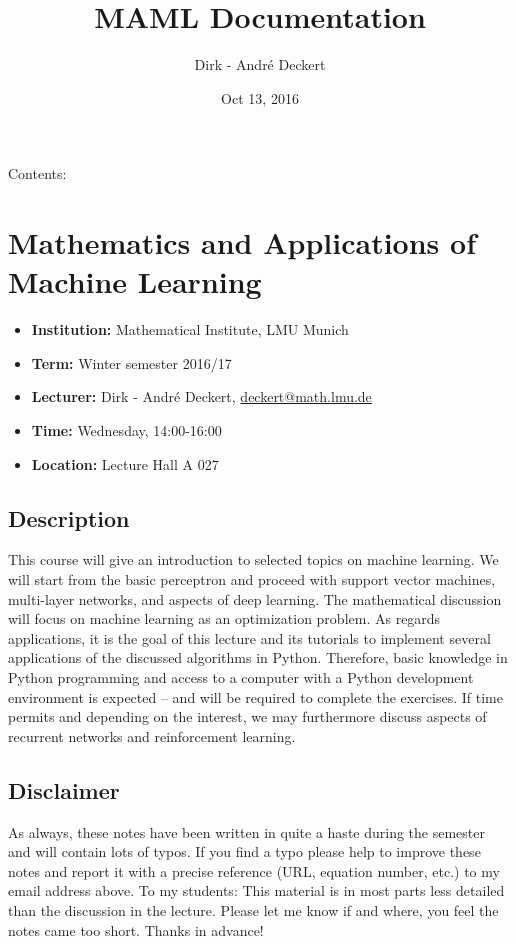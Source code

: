 \documentclass[letterpaper,10pt,english]{sphinxmanual}
\title{MAML Documentation}
\date{Oct 13, 2016}
\author{Dirk - André Deckert}
\begin{document}
\maketitle
\tableofcontents
{}\label{index::doc}


Contents:


\chapter{Mathematics and Applications of Machine Learning}
\label{readme:mathematics-and-applications-of-machine-learning}\label{readme::doc}\begin{itemize}
\item {} 
\textbf{Institution:} Mathematical Institute, LMU Munich

\item {} 
\textbf{Term:} Winter semester 2016/17

\item {} 
\textbf{Lecturer:} Dirk - André Deckert, \href{mailto:deckert@math.lmu.de}{deckert@math.lmu.de}

\item {} 
\textbf{Time:} Wednesday, 14:00-16:00

\item {} 
\textbf{Location:} Lecture Hall A 027

\end{itemize}


\section{Description}
\label{readme:description}
This course will give an introduction to selected topics on machine learning.
We will start from the basic perceptron and proceed with support vector
machines, multi-layer networks, and aspects of deep learning. The mathematical
discussion will focus on machine learning as an optimization problem. As
regards applications, it is the goal of this lecture and its tutorials to
implement several applications of the discussed algorithms in Python.
Therefore, basic knowledge in Python programming and access to a computer with
a Python development environment is expected -- and will be required to
complete the exercises. If time permits and depending on the interest, we may
furthermore discuss aspects of recurrent networks and reinforcement learning.


\section{Disclaimer}
\label{readme:disclaimer}
As always, these notes have been written in quite a haste during the semester
and will contain lots of typos. If you find a typo please help to improve these
notes and report it with a precise reference (URL, equation number, etc.) to my
email address above. To my students: This material is in most parts less
detailed than the discussion in the lecture. Please let me know if and where,
you feel the notes came too short. Thanks in advance!
\end{document}
